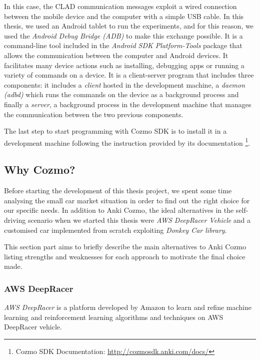 In this case, the CLAD communication messages exploit a wired connection between the mobile device and the computer with a simple USB cable. In this thesis, we used an Android tablet to run the experiments, and for this reason, we used the \textit{Android Debug Bridge (ADB)} to make this exchange possible.
It is a command-line tool included in the \textit{Android SDK Platform-Tools} package that allows the communication between the computer and Android devices. It facilitates many device actions such as installing, debugging apps or running a variety of commands on a device. It is a client-server program that includes three components: it includes a \textit{client} hosted in the development machine, a \textit{daemon (adbd)} which runs the commands on the device as a background process and finally a \textit{server}, a background process in the development machine that manages the communication between the two previous components.

The last step to start programming with Cozmo SDK is to install it in a development machine following the instruction provided by its documentation \footnote{Cozmo SDK Documentation: \href{http://cozmosdk.anki.com/docs/index.html}{http://cozmosdk.anki.com/docs/}}.


\subsection{Why Cozmo?}

Before starting the development of this thesis project, we spent some time analysing the small car market situation in order to find out the right choice for our specific needs. In addition to Anki Cozmo, the ideal alternatives in the self-driving scenario when we started this thesis were \textit{AWS DeepRacer Vehicle} and a customised car implemented from scratch exploiting \textit{Donkey \textregistered
Car library}.

This section part aims to briefly describe the main alternatives to Anki Cozmo listing strengths and weaknesses for each approach to motivate the final choice made.

\subsubsection{AWS DeepRacer}

\textit{AWS DeepRacer} is a platform developed by Amazon to learn and refine machine learning and reinforcement learning algorithms and techniques on AWS DeepRacer vehicle.

